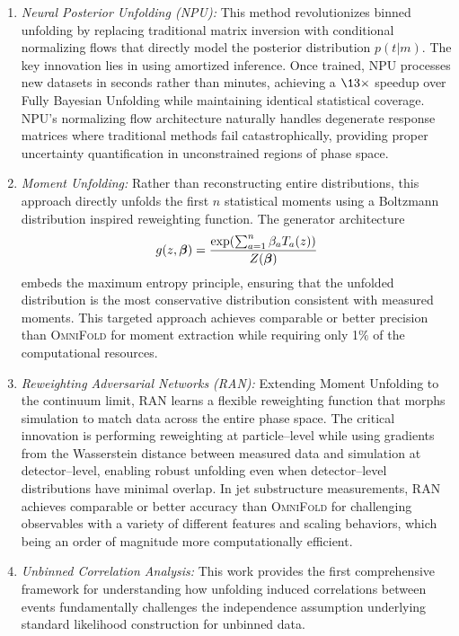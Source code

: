         \begin{enumerate}
            \item \emph{Neural Posterior Unfolding (NPU):} This method revolutionizes binned unfolding by replacing traditional matrix inversion with conditional normalizing flows that directly model the posterior distribution \(p(t|m)\).
            The key innovation lies in using amortized inference.
            Once trained, NPU processes new datasets in seconds rather than minutes, achieving a \(\13\times\) speedup over Fully Bayesian Unfolding while maintaining identical statistical coverage.
            NPU's normalizing flow architecture naturally handles degenerate response matrices where traditional methods fail catastrophically, providing proper uncertainty quantification in unconstrained regions of phase space.
            \item \emph{Moment Unfolding:} Rather than reconstructing entire distributions, this approach directly unfolds the first \(n\) statistical moments using a Boltzmann distribution inspired reweighting function.
            The generator architecture \[g(z,\vb*{\beta}) = \frac{\exp(\sum_{a=1}^n \beta_a T_a(z))}{Z(\vb*{\beta})}\] embeds the maximum entropy principle, ensuring that the unfolded distribution is the most conservative distribution consistent with measured moments.
            This targeted approach achieves comparable or better precision than \textsc{OmniFold} for moment extraction while requiring only 1\(\%\) of the computational resources.
            \item \emph{Reweighting Adversarial Networks (RAN):} Extending Moment Unfolding to the continuum limit, RAN learns a flexible reweighting function that morphs simulation to match data across the entire phase space.
            The critical innovation is performing reweighting at particle--level while using gradients from the Wasserstein distance between measured data and simulation at detector--level, enabling robust unfolding even when detector--level distributions have minimal overlap.
            In jet substructure measurements, RAN achieves comparable or better accuracy than \textsc{OmniFold} for challenging observables with a variety of different features and scaling behaviors, which being an order of magnitude more computationally efficient.
            \item \emph{Unbinned Correlation Analysis:} This work provides the first comprehensive framework for understanding how unfolding induced correlations between events fundamentally challenges the independence assumption underlying standard likelihood construction for unbinned data.

\end{enumerate}
